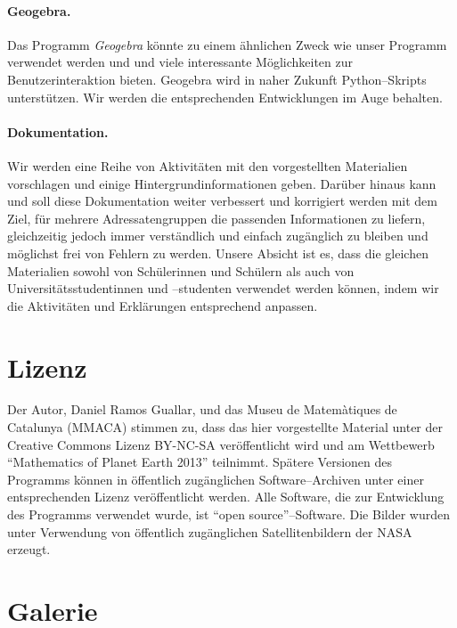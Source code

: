 \documentclass[a4paper,12pt]{article}
\begin{document}
\paragraph{Geogebra.} 
Das Programm \emph{Geogebra} könnte zu einem ähnlichen Zweck wie unser Programm 
verwendet werden und und viele interessante Möglichkeiten zur Benutzerinteraktion 
bieten. Geogebra wird in naher Zukunft Python--Skripts unterstützen. Wir werden 
die entsprechenden Entwicklungen im Auge behalten.

\paragraph{Dokumentation.} 
Wir werden eine Reihe von Aktivitäten mit den vorgestellten Materialien vorschlagen 
und einige Hintergrundinformationen geben. Darüber hinaus kann und soll diese 
Dokumentation weiter verbessert und korrigiert werden mit dem Ziel, für mehrere 
Adressatengruppen die passenden Informationen zu liefern, gleichzeitig jedoch immer 
verständlich und einfach zugänglich zu bleiben und möglichst frei von Fehlern zu werden.
Unsere Absicht ist es, dass die gleichen Materialien sowohl von Schülerinnen und Schülern 
als auch von Universitätsstudentinnen und --studenten verwendet werden können, indem wir 
die Aktivitäten und Erklärungen entsprechend anpassen.


\section{Lizenz}

Der Autor, Daniel Ramos Guallar, und das Museu de Ma\-te\-mà\-ti\-ques de {Catalunya} 
(MMACA) stimmen zu, dass das hier vorgestellte Material unter der Creative Commons 
Lizenz BY-NC-SA veröffentlicht wird und am Wettbewerb "`Mathematics of Planet Earth 2013"' teilnimmt. Spätere 
Versionen des Programms können in öffentlich zugänglichen Software--Archiven unter 
einer entsprechenden Lizenz ver\-öf\-fent\-licht werden. Alle Software, die zur 
Entwicklung des Programms verwendet wurde, ist "`open source"'--Software. Die Bilder 
wurden unter Verwendung von öffentlich zu\-gäng\-lich\-en Satellitenbildern der NASA 
erzeugt.


\section{Galerie}
\end{document}
